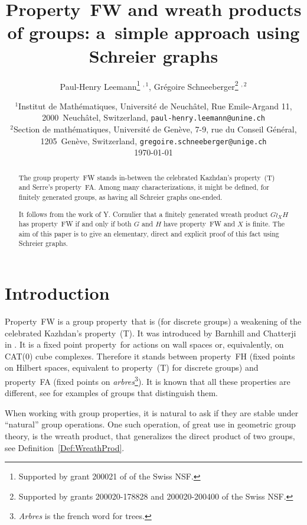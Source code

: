 \documentclass[a4paper]{article}
\title{Property~FW and wreath products of groups: a~simple approach using Schreier graphs}
\author{Paul-Henry Leemann\thanks{Supported by grant 200021\textunderscore188578 of of the Swiss NSF.} $^{,1}$, Grégoire Schneeberger\thanks{Supported by grants 200020-178828 and 200020-200400 of the Swiss NSF.} $^{,2}$}
\date{
{\small $^1$Institut de Math\'ematiques, Universit\'e de Neuch\^atel, Rue Emile-Argand 11, 2000~Neuch\^atel, Switzerland, \texttt{paul-henry.leemann@unine.ch}}\\%
{\small $^2$Section de math\'ematiques, Universit\'e de Gen\`eve, 7-9, rue du Conseil G\'en\'eral, 1205~Gen\`eve, Switzerland, \texttt{gregoire.schneeberger@unige.ch}}\\[2ex]%
\today}
\theoremstyle{definition}
\theoremstyle{remark}
\begin{document}
\maketitle
%
%
%
%
\begin{abstract}
The group property~FW stands in-between the celebrated Kazhdan's property~(T) and Serre's property~FA. Among many characterizations, it might be defined, for finitely generated groups, as having all Schreier graphs one-ended.

It follows from the work of Y. Cornulier that a finitely generated wreath product $G\wr_XH$ has property~FW if and only if both $G$ and $H$ have property~FW and $X$ is finite.
The aim of this paper is to give an elementary, direct and explicit proof of this fact using Schreier graphs.
\end{abstract}
%
%
%
%
\section{Introduction}
Property~FW is a group property~that is (for discrete groups) a weakening of the celebrated Kazhdan's property~(T). It was introduced by Barnhill and Chatterji in \cite{Barnhill2008}. It is a fixed point property~for actions on wall spaces or, equivalently, on CAT(0) cube complexes. Therefore it stands between property~FH (fixed points on Hilbert spaces, equivalent to property~(T) for discrete groups) and property~FA (fixed points on \emph{arbres}\footnote{\emph{Arbres} is the french word for trees.}). It is known that all these properties are different, see  \cite{Cornulier2013} for examples of groups that distinguish them.

When working with group properties, it is natural to ask if they are stable under ``natural'' group operations. One such operation, of great use in geometric group theory, is the wreath product, that generalizes the direct product of two groups, see Definition~\ref{Def:WreathProd}.
\end{document}
